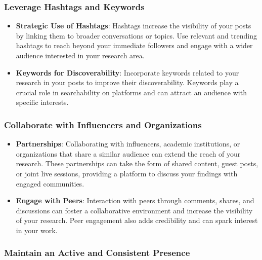 \documentclass[
]{book}
\begin{document}
\hypertarget{leverage-hashtags-and-keywords}{%
\subsubsection{Leverage Hashtags and Keywords}\label{leverage-hashtags-and-keywords}}

\begin{itemize}
\item
  \textbf{Strategic Use of Hashtags}: Hashtags increase the visibility of your posts by linking them to broader conversations or topics. Use relevant and trending hashtags to reach beyond your immediate followers and engage with a wider audience interested in your research area.
\item
  \textbf{Keywords for Discoverability}: Incorporate keywords related to your research in your posts to improve their discoverability. Keywords play a crucial role in searchability on platforms and can attract an audience with specific interests.
\end{itemize}

\hypertarget{collaborate-with-influencers-and-organizations}{%
\subsubsection{Collaborate with Influencers and Organizations}\label{collaborate-with-influencers-and-organizations}}

\begin{itemize}
\item
  \textbf{Partnerships}: Collaborating with influencers, academic institutions, or organizations that share a similar audience can extend the reach of your research. These partnerships can take the form of shared content, guest posts, or joint live sessions, providing a platform to discuss your findings with engaged communities.
\item
  \textbf{Engage with Peers}: Interaction with peers through comments, shares, and discussions can foster a collaborative environment and increase the visibility of your research. Peer engagement also adds credibility and can spark interest in your work.
\end{itemize}

\hypertarget{maintain-an-active-and-consistent-presence}{%
\subsubsection{Maintain an Active and Consistent Presence}\label{maintain-an-active-and-consistent-presence}}
\end{document}
